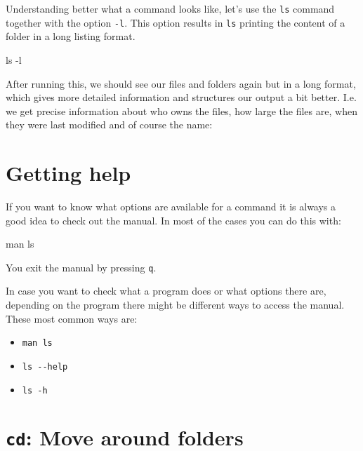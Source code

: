 \documentclass[
  letterpaper,
  DIV=11,
  numbers=noendperiod]{scrreprt}
\newenvironment{Shaded}{}{}
\newcommand{\AttributeTok}[1]{\textcolor[rgb]{0.84,0.23,0.29}{#1}}
\newcommand{\FunctionTok}[1]{\textcolor[rgb]{0.44,0.26,0.76}{#1}}
\newcommand{\NormalTok}[1]{\textcolor[rgb]{0.14,0.16,0.18}{#1}}
\providecommand{\tightlist}{%
  \setlength{\itemsep}{0pt}\setlength{\parskip}{0pt}}\usepackage{longtable,booktabs,array}
\begin{document}
Understanding better what a command looks like, let's use the
\texttt{ls} command together with the option \texttt{-l}. This option
results in \texttt{ls} printing the content of a folder in a long
listing format.

\begin{Shaded}
\begin{Highlighting}[]
\FunctionTok{ls} \AttributeTok{{-}l}
\end{Highlighting}
\end{Shaded}

After running this, we should see our files and folders again but in a
long format, which gives more detailed information and structures our
output a bit better. I.e. we get precise information about who owns the
files, how large the files are, when they were last modified and of
course the name:

\section{Getting help}\label{getting-help}

If you want to know what options are available for a command it is
always a good idea to check out the manual. In most of the cases you can
do this with:

\begin{Shaded}
\begin{Highlighting}[]
\FunctionTok{man}\NormalTok{ ls}
\end{Highlighting}
\end{Shaded}

You exit the manual by pressing \texttt{q}.

In case you want to check what a program does or what options there are,
depending on the program there might be different ways to access the
manual. These most common ways are:

\begin{itemize}
\tightlist
\item
  \texttt{man\ ls}
\item
  \texttt{ls\ -\/-help}
\item
  \texttt{ls\ -h}
\end{itemize}

\section{\texorpdfstring{\texttt{cd}: Move around
folders}{cd: Move around folders}}\label{cd-move-around-folders}
\end{document}
